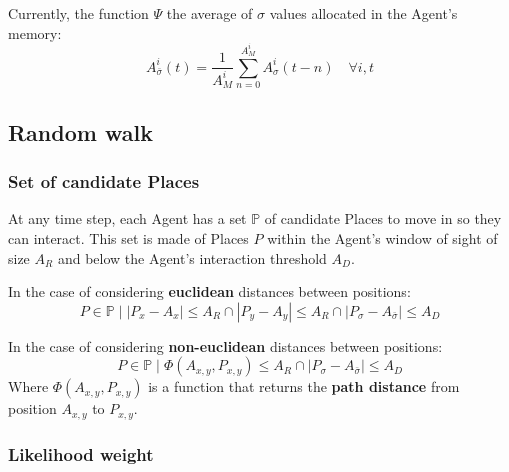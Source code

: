 \documentclass{article}
\begin{document}
Currently, the function $\Psi$ the average of $\sigma$ values allocated in the Agent's memory:
\begin{equation}
    A^{i}_{\bar{\sigma}}(t) = \frac{1}{A^{i}_{M}} \sum_{n=0}^{A^{i}_{M}} A^{i}_{\sigma}(t - n) \quad \forall i, t
\end{equation}

\subsection{Random walk}

\subsubsection{Set of candidate Places}

\par At any time step, each Agent has a set $\mathbb{P}$ of candidate Places to move in so they can interact. This set is made of Places $P$ within the Agent's window of sight of size $A_{R}$ and below the Agent's interaction threshold $A_{D}$.

\par In the case of considering \textbf{euclidean} distances between positions:
\begin{equation}
    P \in \mathbb{P} \;\big|\;|P_{x} - A_{x}| \leq A_{R} \cap |P_{y} - A_{y}| \leq A_{R} \cap |P_{\sigma} - A_{\bar{\sigma}}| \leq A_{D}
\end{equation}

\par In the case of considering \textbf{non-euclidean} distances between positions:
\begin{equation}
    P \in \mathbb{P} \;\big|\; \Phi(A_{x,y},P_{x,y}) \leq A_{R} \cap |P_{\sigma} - A_{\bar{\sigma}}| \leq A_{D}
\end{equation}
Where $\Phi(A_{x,y},P_{x,y})$ is a function that returns the \textbf{path distance} from position $A_{x,y}$ to $P_{x,y}$.

\subsubsection{Likelihood weight}
\end{document}
